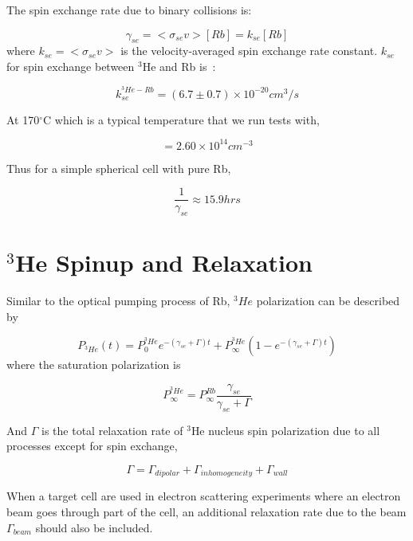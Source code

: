 The spin exchange rate due to binary collisions is:

\begin{equation}
\gamma_{se}=<\sigma_{se}v>[Rb]=k_{se}[Rb]
\end{equation}
where $k_{se}=<\sigma_{se}v>$ is the velocity-averaged spin exchange rate constant. $k_{se}$ for spin exchange between $^{3}$He and Rb is~\cite{PhysRevLett.80.2801}:

\begin{equation}
k_{se}^{^{3}He-Rb}=(6.7\pm 0.7)\times 10^{-20}cm^{3}/s
\end{equation}

At 170$^{\circ}$C which is a typical temperature that we run tests with,

\begin{equation}
[Rb]=2.60\times 10^{14}cm^{-3}
\end{equation}

Thus for a simple spherical cell with pure Rb,

\begin{equation}
\frac{1}{\gamma_{se}}\approx 15.9 hrs
\end{equation}

\section{$^{3}$He Spinup and Relaxation}

Similar to the optical pumping process of Rb, $^{3}He$ polarization can be described by

\begin{equation}
P_{^{3}He}(t)=P_{0}^{^{3}He}e^{-(\gamma_{se}+\Gamma)t}+P_{\infty}^{^{3}He}(1-e^{-(\gamma_{se}+\Gamma)t})
\end{equation}
where the saturation polarization is

\begin{equation}
P_{\infty}^{^{3}He}=P_{\infty}^{Rb}\frac{\gamma_{se}}{\gamma_{se}+\Gamma}
\end{equation}

And $\Gamma$ is the total relaxation rate of $^{3}$He nucleus spin polarization due to all processes except for spin exchange,

\begin{equation}
\Gamma=\Gamma_{dipolar}+\Gamma_{inhomogeneity}+\Gamma_{wall}
\end{equation}

When a target cell are used in electron scattering experiments where an electron beam goes through part of the cell, an additional relaxation rate due to the beam $\Gamma_{beam}$ should also be included.

